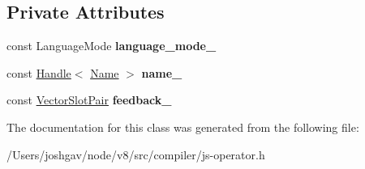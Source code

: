 \subsection*{Private Attributes}
\begin{DoxyCompactItemize}
\item 
const Language\+Mode {\bfseries language\+\_\+mode\+\_\+}\hypertarget{classv8_1_1internal_1_1compiler_1_1_store_global_parameters_ad8a32842da9ef87a6bfbdee6368baaf5}{}\label{classv8_1_1internal_1_1compiler_1_1_store_global_parameters_ad8a32842da9ef87a6bfbdee6368baaf5}

\item 
const \hyperlink{classv8_1_1internal_1_1_handle}{Handle}$<$ \hyperlink{classv8_1_1internal_1_1_name}{Name} $>$ {\bfseries name\+\_\+}\hypertarget{classv8_1_1internal_1_1compiler_1_1_store_global_parameters_addb9a914c4ad1615a915e967a125d9bf}{}\label{classv8_1_1internal_1_1compiler_1_1_store_global_parameters_addb9a914c4ad1615a915e967a125d9bf}

\item 
const \hyperlink{classv8_1_1internal_1_1compiler_1_1_vector_slot_pair}{Vector\+Slot\+Pair} {\bfseries feedback\+\_\+}\hypertarget{classv8_1_1internal_1_1compiler_1_1_store_global_parameters_a86c33e3742ae4c415f5dc219bf358803}{}\label{classv8_1_1internal_1_1compiler_1_1_store_global_parameters_a86c33e3742ae4c415f5dc219bf358803}

\end{DoxyCompactItemize}


The documentation for this class was generated from the following file\+:\begin{DoxyCompactItemize}
\item 
/\+Users/joshgav/node/v8/src/compiler/js-\/operator.\+h\end{DoxyCompactItemize}
